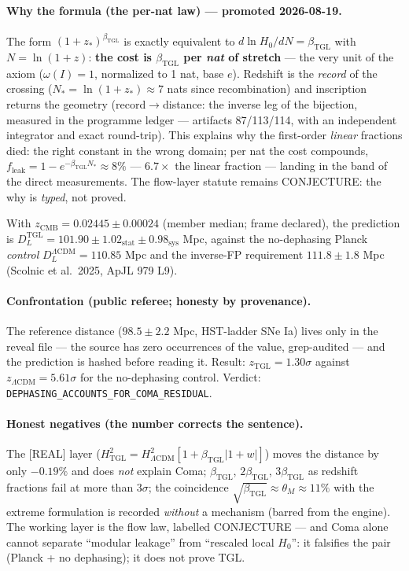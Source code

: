 \documentclass[11pt]{article}
\newcommand{\bTGL}{\beta_{\mathrm{TGL}}}\newcommand{\Msun}{M_{\odot}}\newcommand{\TGL}{\mathrm{TGL}}
\theoremstyle{definition}\newtheorem{deriv}{Derivation}
\begin{document}
\paragraph{Why the formula (the per-nat law) --- promoted 2026-08-19.} The form $(1+z_*)^{\bTGL}$ is exactly equivalent to $d\ln H_0/dN=\bTGL$ with $N=\ln(1+z)$: \textbf{the cost is $\bTGL$ per \emph{nat} of stretch} --- the very unit of the axiom ($\omega(I)=1$, normalized to 1 nat, base $e$). Redshift is the \emph{record} of the crossing ($N_*=\ln(1+z_*)\approx 7$ nats since recombination) and inscription returns the geometry (record$\to$distance: the inverse leg of the bijection, measured in the programme ledger --- artifacts 87/113/114, with an independent integrator and exact round-trip). This explains why the first-order \emph{linear} fractions died: the right constant in the wrong domain; per nat the cost compounds, $f_{\mathrm{leak}}=1-e^{-\bTGL N_*}\approx 8\%$ --- $6.7\times$ the linear fraction --- landing in the band of the direct measurements. The flow-layer statute remains \textsf{CONJECTURE}: the why is \emph{typed}, not proved.

With $z_{\mathrm{CMB}}=0.02445\pm0.00024$ (member median; frame declared), the prediction is $D_L^{\mathrm{TGL}}=101.90\pm1.02_{\mathrm{stat}}\pm0.98_{\mathrm{sys}}$ Mpc, against the no-dephasing Planck \emph{control} $D_L^{\Lambda\mathrm{CDM}}=110.85$ Mpc and the inverse-FP requirement $111.8\pm1.8$ Mpc (Scolnic et al.\ 2025, ApJL 979 L9).

\paragraph{Confrontation (public referee; honesty by provenance).} The reference distance ($98.5\pm2.2$ Mpc, HST-ladder SNe Ia) lives only in the reveal file --- the source has zero occurrences of the value, grep-audited --- and the prediction is hashed before reading it. Result: $z_{\mathrm{TGL}}=1.30\sigma$ against $z_{\Lambda\mathrm{CDM}}=5.61\sigma$ for the no-dephasing control. Verdict: \texttt{DEPHASING\_ACCOUNTS\_FOR\_COMA\_RESIDUAL}.

\paragraph{Honest negatives (the number corrects the sentence).} The [REAL] layer ($H^2_{\mathrm{TGL}}=H^2_{\Lambda\mathrm{CDM}}[1+\bTGL|1+w|]$) moves the distance by only $-0.19\%$ and does \emph{not} explain Coma; $\bTGL$, $2\bTGL$, $3\bTGL$ as redshift fractions fail at more than $3\sigma$; the coincidence $\sqrt{\bTGL}\approx\theta_M\approx11\%$ with the extreme formulation is recorded \emph{without} a mechanism (barred from the engine). The working layer is the flow law, labelled \textsf{CONJECTURE} --- and Coma alone cannot separate ``modular leakage'' from ``rescaled local $H_0$'': it falsifies the pair (Planck + no dephasing); it does not prove TGL.
\end{document}
